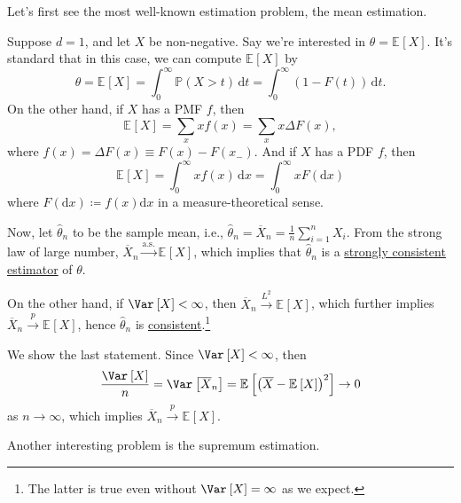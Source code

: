 Let's first see the most well-known estimation problem, the mean estimation.

\begin{eg}
	Suppose \(d = 1\), and let \(X\) be non-negative. Say we're interested in \(\theta = \mathbb{E}_{}\left[X \right] \). It's standard that in this case, we can compute \(\mathbb{E}_{}\left[X \right] \) by
	\[
		\theta
		= \mathbb{E}_{}\left[X \right]
		= \int_{0}^{\infty} \mathbb{P} (X > t) \,\mathrm{d}t
		= \int_{0}^{\infty} (1 - F(t)) \,\mathrm{d}t.
	\]
	On the other hand, if \(X\) has a PMF \(f\), then
	\[
		\mathbb{E}_{}\left[X \right]
		= \sum_{x} x f(x)
		= \sum_{x} x \Delta F(x),
	\]
	where \(f(x) = \Delta F(x) \equiv F(x) - F(x_-)\). And if \(X\) has a PDF \(f\), then
	\[
		\mathbb{E}_{}\left[X \right]
		= \int_{0}^{\infty} x f(x) \,\mathrm{d}x
		= \int_{0}^{\infty} x F(\mathrm{d}x)
	\]
	where \(F(\mathrm{d} x) \coloneqq f(x) \mathrm{d} x\) in a measure-theoretical sense.

	Now, let \(\hat{\theta} _n\) to be the sample mean, i.e., \(\hat{\theta} _n = \overline{X} _n = \frac{1}{n} \sum_{i=1}^{n} X_i\). From the strong law of large number, \(\overline{X} _n \overset{\text{a.s.} }{\to } \mathbb{E}_{}\left[ X \right] \), which implies that \(\hat{\theta} _n\) is a \hyperref[def:strongly-consistent]{strongly consistent estimator} of \(\theta \).

	On the other hand, if \(\Var_{}\left[X \right] < \infty \), then \(\overline{X} _n \overset{L^2}{\to } \mathbb{E}_{}\left[X \right] \), which further implies \(\overline{X} _n \overset{p}{\to } \mathbb{E}_{}\left[X \right] \), hence \(\hat{\theta} _n\) is \hyperref[def:consistent]{consistent}.\footnote{The latter is true even without \(\Var_{}\left[X \right] = \infty \) as we expect.}
\end{eg}
\begin{explanation}
	We show the last statement. Since \(\Var_{}\left[X \right] < \infty \), then
	\[
		\frac{\Var_{}\left[X \right] }{n}
		= \Var_{}\left[\overline{X} _n \right]
		= \mathbb{E}_{}\left[ \left( \overline{X} - \mathbb{E}_{}\left[X \right]  \right) ^2 \right]
		\to 0
	\]
	as \(n \to \infty \), which implies \(\overline{X} _n \overset{p}{\to } \mathbb{E}_{}\left[X \right] \).
\end{explanation}

Another interesting problem is the supremum estimation.

